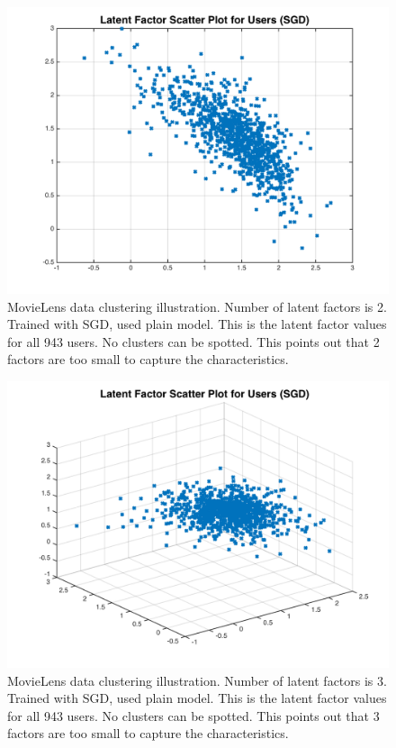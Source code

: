 \documentclass[11pt]{article}
\begin{document}
	\begin{figure}[H]
		\centering		
		\includegraphics[width=\wi]{buff5/users}
		\caption{MovieLens data clustering illustration. Number of latent factors is 2. Trained with SGD, used plain model. This is the latent factor values for all 943 users. No clusters can be spotted. This points out that 2 factors are too small to capture the characteristics.}
		\label{5}		
	\end{figure}
	\begin{figure}[H]
		\centering		
		\includegraphics[width=\wi]{buff5/users2}
		\caption{MovieLens data clustering illustration. Number of latent factors is 3. Trained with SGD, used plain model. This is the latent factor values for all 943 users. No clusters can be spotted. This points out that 3 factors are too small to capture the characteristics.}
		\label{5}		
	\end{figure}
\end{document}
